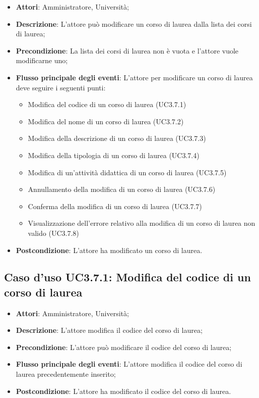 \begin{itemize}
\item \textbf{Attori}: Amministratore, Università;
\item \textbf{Descrizione}: L'attore può modificare un corso di laurea dalla lista dei corsi di laurea;

\item \textbf{Precondizione}: La lista dei corsi di laurea non è vuota e l'attore vuole modificarne uno;

\item \textbf{Flusso principale degli eventi}: L'attore per modificare un corso di laurea deve seguire i seguenti punti:

\begin{itemize}
\item Modifica del codice di un corso di laurea (UC3.7.1)
\item Modifica del nome di un corso di laurea (UC3.7.2)
\item Modifica della descrizione di un corso di laurea (UC3.7.3)
\item Modifica della tipologia di un corso di laurea (UC3.7.4)
\item Modifica di un'attività didattica di un corso di laurea (UC3.7.5)
\item Annullamento della modifica di un corso di laurea (UC3.7.6)
\item Conferma della modifica di un corso di laurea (UC3.7.7)
\item Visualizzazione dell'errore relativo alla modifica di un corso di laurea non valido (UC3.7.8)
\end{itemize}
\item \textbf{Postcondizione}: L'attore ha modificato un corso di laurea.

\end{itemize}
\subsection{Caso d'uso \texorpdfstring{UC3.7.1}{UC3.7.1}: Modifica del codice di un corso di laurea}
\begin{itemize}
\item \textbf{Attori}: Amministratore, Università;
\item \textbf{Descrizione}: L'attore modifica il codice del corso di laurea;

\item \textbf{Precondizione}: L'attore può modificare il codice del corso di laurea;

\item \textbf{Flusso principale degli eventi}: L'attore modifica il codice del corso di laurea precedentemente inserito;

\item \textbf{Postcondizione}: L'attore ha modificato il codice del corso di laurea.

\end{itemize}
